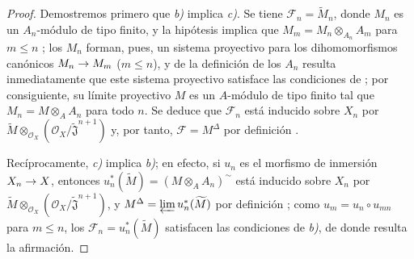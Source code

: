 \documentclass[oneside]{amsart}
\theoremstyle{ega-env-style}
\theoremstyle{ega-thm-env-style}
\theoremstyle{ega-defn-env-style}
\def\leq{\leqslant}                 %
\renewcommand{\to}{\mathchoice{\longrightarrow}{\rightarrow}{\rightarrow}{\rightarrow}}
\begin{document}
\begin{proof}
Demostremos primero que \emph{b)} implica \emph{c)}.
Se tiene $\mathscr{F}_n=\widetilde{M}_n$, donde $M_n$ es un $A_n$-módulo de tipo finito, y la hipótesis implica que $M_m=M_n\otimes_{A_n}A_m$ para $m\leq n$ ; los $M_n$ forman, pues, un sistema proyectivo para los dihomomorfismos canónicos $M_n\to M_m$ ($m\leq n$), y de la definición de los $A_n$ resulta inmediatamente que este sistema proyectivo satisface las condiciones de ; por consiguiente, su límite proyectivo $M$ es un $A$-módulo de tipo finito tal que $M_n=M\otimes_A A_n$ para todo $n$.
Se deduce que $\mathscr{F}_n$ está inducido sobre $X_n$ por $\widetilde M\otimes_{\mathscr{O}_X}
(\mathscr{O}_X/\widetilde{\mathfrak{J}}^{n+1})$ y, por tanto, $\mathscr{F}=M^\Delta$ por definición .

Recíprocamente, \emph{c)} implica \emph{b)}; en efecto, si $u_n$ es el morfismo de inmersión $X_n\to X$, entonces $u_n^*(\widetilde M)=(M\otimes_A A_n)^{\sim}$ está inducido sobre $X_n$ por $\widetilde M\otimes_{\mathscr{O}_X}
(\mathscr{O}_X/\widetilde{\mathfrak{J}}^{n+1})$, y $M^\Delta=\varprojlim u_n^*(\widetilde M)$ por definición ; como $u_m=u_n\circ u_{mn}$ para $m\leq n$, los $\mathscr{F}_n=u_n^*(\widetilde M)$ satisfacen las condiciones de \emph{b)}, de donde resulta la afirmación.


\end{proof}
\end{document}
